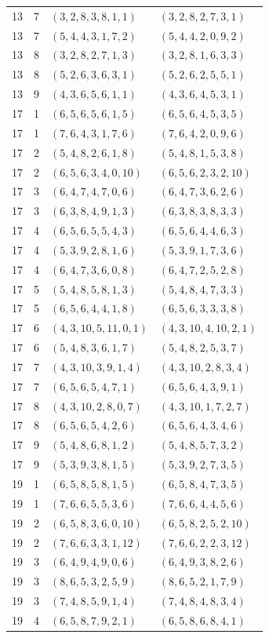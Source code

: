 \documentclass[11pt,a4paper,oneside,openany]{book}
\theoremstyle{definition}
\numberwithin{equation}{chapter}
\begin{document}
\begin{longtable}{rrll}
13&7&$(3,2,8,3,8,1,1)$&$(3,2,8,2,7,3,1)$\\
13&7&$(5,4,4,3,1,7,2)$&$(5,4,4,2,0,9,2)$\\
13&8&$(3,2,8,2,7,1,3)$&$(3,2,8,1,6,3,3)$\\
13&8&$(5,2,6,3,6,3,1)$&$(5,2,6,2,5,5,1)$\\
13&9&$(4,3,6,5,6,1,1)$&$(4,3,6,4,5,3,1)$\\
17&1&$(6,5,6,5,6,1,5)$&$(6,5,6,4,5,3,5)$\\
17&1&$(7,6,4,3,1,7,6)$&$(7,6,4,2,0,9,6)$\\
17&2&$(5,4,8,2,6,1,8)$&$(5,4,8,1,5,3,8)$\\
17&2&$(6,5,6,3,4,0,10)$&$(6,5,6,2,3,2,10)$\\
17&3&$(6,4,7,4,7,0,6)$&$(6,4,7,3,6,2,6)$\\
17&3&$(6,3,8,4,9,1,3)$&$(6,3,8,3,8,3,3)$\\
17&4&$(6,5,6,5,5,4,3)$&$(6,5,6,4,4,6,3)$\\
17&4&$(5,3,9,2,8,1,6)$&$(5,3,9,1,7,3,6)$\\
17&4&$(6,4,7,3,6,0,8)$&$(6,4,7,2,5,2,8)$\\
17&5&$(5,4,8,5,8,1,3)$&$(5,4,8,4,7,3,3)$\\
17&5&$(6,5,6,4,4,1,8)$&$(6,5,6,3,3,3,8)$\\
17&6&$(4,3,10,5,11,0,1)$&$(4,3,10,4,10,2,1)$\\
17&6&$(5,4,8,3,6,1,7)$&$(5,4,8,2,5,3,7)$\\
17&7&$(4,3,10,3,9,1,4)$&$(4,3,10,2,8,3,4)$\\
17&7&$(6,5,6,5,4,7,1)$&$(6,5,6,4,3,9,1)$\\
17&8&$(4,3,10,2,8,0,7)$&$(4,3,10,1,7,2,7)$\\
17&8&$(6,5,6,5,4,2,6)$&$(6,5,6,4,3,4,6)$\\
17&9&$(5,4,8,6,8,1,2)$&$(5,4,8,5,7,3,2)$\\
17&9&$(5,3,9,3,8,1,5)$&$(5,3,9,2,7,3,5)$\\
19&1&$(6,5,8,5,8,1,5)$&$(6,5,8,4,7,3,5)$\\
19&1&$(7,6,6,5,5,3,6)$&$(7,6,6,4,4,5,6)$\\
19&2&$(6,5,8,3,6,0,10)$&$(6,5,8,2,5,2,10)$\\
19&2&$(7,6,6,3,3,1,12)$&$(7,6,6,2,2,3,12)$\\
19&3&$(6,4,9,4,9,0,6)$&$(6,4,9,3,8,2,6)$\\
19&3&$(8,6,5,3,2,5,9)$&$(8,6,5,2,1,7,9)$\\
19&3&$(7,4,8,5,9,1,4)$&$(7,4,8,4,8,3,4)$\\
19&4&$(6,5,8,7,9,2,1)$&$(6,5,8,6,8,4,1)$\\

\end{longtable}
\end{document}

